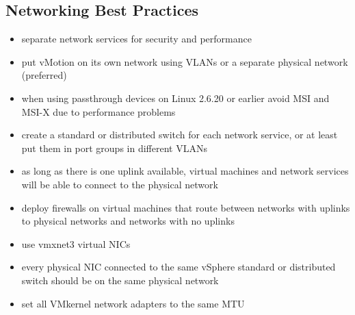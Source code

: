 \subsection{Networking Best Practices}

\begin{itemize}

\item separate network services for security and performance

\item put vMotion on its own network using VLANs or a separate physical network
(preferred)

\item when using passthrough devices on Linux 2.6.20 or earlier avoid MSI
and MSI-X due to performance problems

\item create a standard or distributed switch for each network service, or
at least put them in port groups in different VLANs

\item as long as there is one uplink available, virtual machines and network
services will be able to connect to the physical network

\item deploy firewalls on virtual machines that route between networks with
uplinks to physical networks and networks with no uplinks

\item use vmxnet3 virtual NICs

\item every physical NIC connected to the same vSphere standard or distributed
switch should be on the same physical network

\item set all VMkernel network adapters to the same MTU

\end{itemize}
